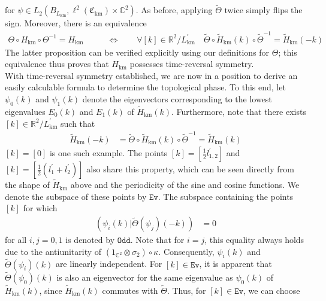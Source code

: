 for $\psi \in  L_{2}(B_{L_{\textrm{km}}},\ell^{2}(\mathfrak{C}_{\textrm{km}}) \times \mathbb{C}^{2})$.
As before, applying $\tilde{\Theta}$ twice simply flips the sign.
Moreover, there is an equivalence
\begin{align*}
  \Theta
  \circ
  H_{\textrm{km}}
  \circ
  \Theta^{-1}
  =
  H_{\textrm{km}}
  \qquad
  &\Leftrightarrow
  \qquad
  \forall
  [k]
  \in
  \mathbb{R}^{2}/L_{\textrm{km}}^{\prime}
  \quad
  \tilde{\Theta}
  \circ
  \tilde{H}_{\textrm{km}}(k)
  \circ
  \tilde{\Theta}^{-1}
  =
  \tilde{H}_{\textrm{km}}(-k)
\end{align*}
The latter proposition can be verified explicitly using our definitions for $\Theta$; this equivalence thus proves that $H_{\textrm{km}}$ possesses time-reversal symmetry.
\\
With time-reversal symmetry established, we are now in a position to derive an easily calculable formula to determine the topological phase.
To this end, let $\psi_{0}(k)$ and $\psi_{1}(k)$ denote the eigenvectors corresponding to the lowest eigenvalues $E_{0}(k)$ and $E_{1}(k)$ of $\tilde{H}_{\textrm{km}}(k)$.
Furthermore, note that there exists $[k] \in \mathbb{R}^{2}/L_{\textrm{km}}^{\prime}$ such that
\begin{align*}
  \tilde{H}_{\textrm{km}}(-k)
  &=
  \tilde{\Theta}
  \circ
  \tilde{H}_{\textrm{km}}(k)
  \circ
  \tilde{\Theta}^{-1}
  =
  \tilde{H}_{\textrm{km}}(k)
\end{align*}
$[k] = [0]$ is one such example.
The points $[k] = [\frac{1}{2}l_{1,2}^{\prime}]$ and $[k] = [\frac{1}{2}(l_{1}^{\prime} + l_{2}^{\prime})]$ also share this property, which can be seen directly from the shape of $\tilde{H}_{\textrm{km}}$ above and the periodicity of the sine and cosine functions.
We denote the subspace of these points by $\mathtt{Ev}$.
The subspace containing the points $[k]$ for which
\begin{align*}
  (\psi_{i}(k) \vert \tilde{\Theta}(\psi_{j})(-k))
  &=
  0
\end{align*}
for all $i,j = 0,1$ is denoted by $\mathtt{Odd}$.
Note that for $i = j$, this equality always holds due to the antiunitarity of $(1_{\mathbb{C}^{2}} \otimes \sigma_{2}) \circ \kappa$.
Consequently, $\psi_{i}(k)$ and $\tilde{\Theta}(\psi_{i})(k)$ are linearly independent.
For $[k] \in \mathtt{Ev}$, it is apparent that $\tilde{\Theta}(\psi_{0})(k)$ is also an eigenvector for the same eigenvalue as $\psi_{0}(k)$ of $\tilde{H}_{\textrm{km}}(k)$, since $\tilde{H}_{\textrm{km}}(k)$ commutes with $\tilde{\Theta}$.
Thus, for $[k] \in \mathtt{Ev}$, we can choose
